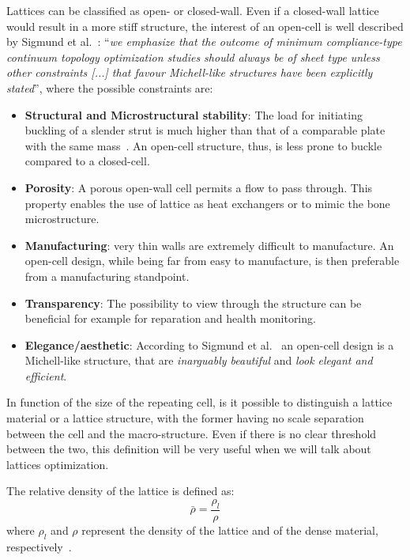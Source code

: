 Lattices can be classified as open- or closed-wall. Even if a closed-wall lattice would result in a more stiff structure, the interest of an open-cell is well described by Sigmund et al.~: ``\textit{we emphasize that the outcome of minimum compliance-type continuum topology optimization studies should always be of sheet type unless other constraints [...] that favour Michell-like structures have been explicitly stated}'', where the possible constraints are:
\begin{itemize}
    \item \textbf{Structural and Microstructural stability}: The load for initiating buckling of a slender strut is much higher than that of a comparable plate with the same mass~. An open-cell structure, thus, is less prone to buckle compared to a closed-cell.
    \item \textbf{Porosity}: A porous open-wall cell permits a flow to pass through. This property enables the use of lattice as heat exchangers or to mimic the bone microstructure.
    \item \textbf{Manufacturing}: very thin walls are extremely difficult to manufacture. An open-cell design, while being far from easy to manufacture, is then preferable from a manufacturing standpoint. 
    \item \textbf{Transparency}: The possibility to view through the structure can be beneficial for example for reparation and health monitoring.
    \item \textbf{Elegance/aesthetic}: According to Sigmund et al.~\cite{sigmund_non-optimality_2016} an open-cell design is a Michell-like structure, that are \textit{inarguably beautiful} and \textit{look elegant and efficient}.
\end{itemize}

In function of the size of the repeating cell, is it possible to distinguish a lattice material or a lattice structure, with the former having no scale separation between the cell and the macro-structure. Even if there is no clear threshold between the two, this definition will be very useful when we will talk about lattices optimization.

The relative density of the lattice is defined as:
\begin{equation}
    \bar{\rho} = \frac{\rho_l}{\rho}
\end{equation}
where $\rho_l$ and $\rho$ represent the density of the lattice and of the dense material, respectively~.

